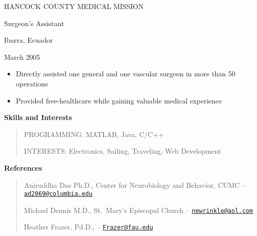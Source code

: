 HANCOCK COUNTY MEDICAL MISSION

Surgeon's Assistant

Ibarra, Ecuador

March 2005

\begin{itemize}
\item
  Directly assisted one general and one vascular surgeon in more than 50
  operations
\item
  Provided free-healthcare while gaining valuable medical experience
\end{itemize}

\textbf{Skills and Interests}

\begin{quote}
PROGRAMMING: MATLAB, Java, C/C++

INTERESTS: Electronics, Sailing, Traveling, Web Development
\end{quote}

\textbf{References}

\begin{quote}
Aniruddha Das Ph.D., Center for Neurobiology and Behavior, CUMC --
\href{mailto:ad2069@columbia.edu}{\nolinkurl{ad2069@columbia.edu}}

Michael Dennis M.D., St.~Mary's Episcopal Church --
\href{mailto:newrinkle@aol.com}{\nolinkurl{newrinkle@aol.com}}

Heather Frazer, Pd.D., --
\href{mailto:Frazer@fau.edu}{\nolinkurl{Frazer@fau.edu}}
\end{quote}
